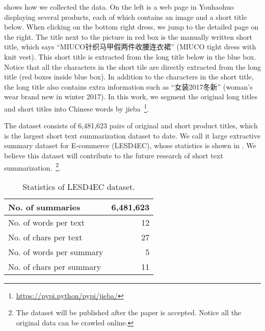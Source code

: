  shows how we collected the data.
On the left is a web page in Youhaohuo displaying several products, 
each of which contains an image and a short title below. 
When clicking on the bottom right dress, we jump to the detailed page 
on the right.  The title next to the picture in red box is the manually 
written short title, which says ``MIUCO针织马甲假两件收腰连衣裙'' (MIUCO tight dress with knit vest).
This short title is extracted from the long title below in the blue box. 
Notice that all the characters in the short tile are directly extracted from 
the long title (red boxes inside blue box). 
In addition to the characters in the short title, the long title also 
contains extra information such as ``女装2017冬新'' (woman's wear brand new
in winter 2017). In this work, we segment the original long titles and 
short titles into Chinese words by jieba~\footnote{\url{https://pypi.python/pypi/jieba/}}.


The dataset consists of 6,481,623 pairs of original and short product titles, 
which is the largest short text summarization dataset to date.
We call it large extractive summary dataset for E-commerce (LESD4EC),
whose statistics is shown in .
We believe this dataset will contribute to the future research of
short text summarization.~\footnote{The dataset will be published after
the paper is accepted. Notice all the original data can be crawled online.}.

\begin{table}[th]
	\centering
	\scriptsize
	\caption{Statistics of LESD4EC dataset.}
	\label{tab:data}
	\begin{tabular}{l|r}
		\toprule
		No. of summaries & 6,481,623 \\%
		\midrule
		No. of words per text  & 12 \\ %
		\midrule
		No. of chars per text & 27  \\ %
		\midrule
		No. of words per summary & 5  \\ %
		\midrule
		No. of chars per summary & 11  \\ %
		\bottomrule
	\end{tabular}
	\vspace{-10pt}
\end{table}


